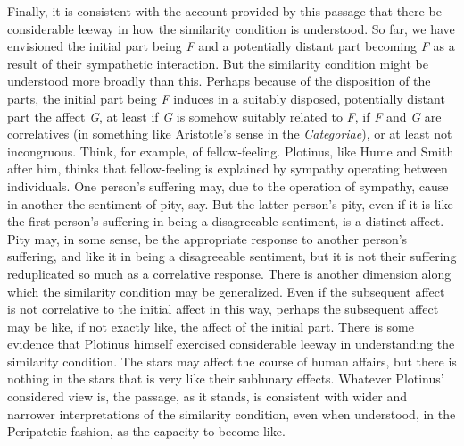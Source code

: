 Finally, it is consistent with the account provided by this passage that there be considerable leeway in how the similarity condition is understood. So far, we have envisioned the initial part being \emph{F} and a potentially distant part becoming \emph{F} as a result of their sympathetic interaction. But the similarity condition might be understood more broadly than this. Perhaps because of the disposition of the parts, the initial part being \emph{F} induces in a suitably disposed, potentially distant part the affect \emph{G}, at least if \emph{G} is somehow suitably related to \emph{F}, if \emph{F} and \emph{G} are correlatives (in something like Aristotle's sense in the \emph{Categoriae}), or at least not incongruous. Think, for example, of fellow-feeling. Plotinus, like Hume and Smith after him, thinks that fellow-feeling is explained by sympathy operating between individuals. One person's suffering may, due to the operation of sympathy, cause in another the sentiment of pity, say. But the latter person's pity, even if it is like the first person's suffering in being a disagreeable sentiment, is a distinct affect. Pity may, in some sense, be the appropriate response to another person's suffering, and like it in being a disagreeable sentiment, but it is not their suffering reduplicated so much as a correlative response. There is another dimension along which the similarity condition may be generalized. Even if the subsequent affect is not correlative to the initial affect in this way, perhaps the subsequent affect may be like, if not exactly like, the affect of the initial part. There is some evidence that Plotinus himself exercised considerable leeway in understanding the similarity condition. The stars may affect the course of human affairs, but there is nothing in the stars that is very like their sublunary effects. Whatever Plotinus' considered view is, the passage, as it stands, is consistent with wider and narrower interpretations of the similarity condition, even when understood, in the Peripatetic fashion, as the capacity to become like.

